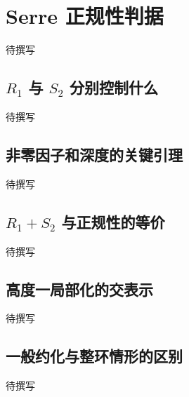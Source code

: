 
% 
% 

\section{Serre 正规性判据}
\label{g5:sec:0904}

待撰写

\subsection{\texorpdfstring{\(R_1\) 与 \(S_2\) 分别控制什么}{R₁ 与 S₂ 分别控制什么}}
\label{g5:subsec:0904:01}
待撰写

\subsection{非零因子和深度的关键引理}
\label{g5:subsec:0904:02}
待撰写

\subsection{\texorpdfstring{\(R_1+S_2\) 与正规性的等价}{R₁+S₂ 与正规性的等价}}
\label{g5:subsec:0904:03}
待撰写

\subsection{高度一局部化的交表示}
\label{g5:subsec:0904:04}
待撰写

\subsection{一般约化与整环情形的区别}
\label{g5:subsec:0904:05}
待撰写

